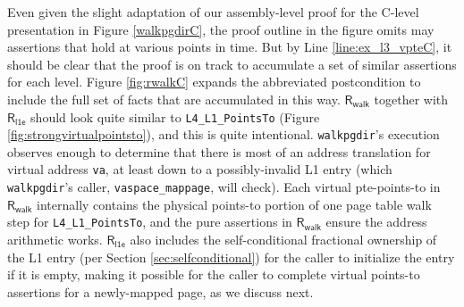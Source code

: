 Even given the slight adaptation of our assembly-level proof for the C-level presentation in Figure \ref{walkpgdirC},
the proof outline in the figure omits may assertions that hold at various points in time.
But by Line \ref{line:ex_l3_vpteC}, it should be clear that the proof is on track to accumulate a set of similar assertions for each level.
Figure \ref{fig:rwalkC} expands the abbreviated postcondition to include the full set of facts that are accumulated in this way.
$\mathsf{R}_\mathsf{walk}$ together with $\mathsf{R}_{\mathsf{l1e}}$ should look quite similar to \lstinline|L4_L1_PointsTo| (Figure \ref{fig:strongvirtualpointsto}),
and this is quite intentional. \lstinline|walkpgdir|'s execution observes enough
to determine that there is most of an address translation for virtual address \lstinline|va|,
at least down to a possibly-invalid L1 entry (which \lstinline|walkpgdir|'s caller, \lstinline|vaspace_mappage|, will check). 
Each virtual pte-points-to in $\mathsf{R}_\mathsf{walk}$ internally contains the physical points-to portion of one page table walk step for \lstinline|L4_L1_PointsTo|,
and the pure assertions in $\mathsf{R}_\mathsf{walk}$ ensure the address arithmetic works.
$\mathsf{R}_{\mathsf{l1e}}$ also includes the self-conditional fractional ownership of the L1 entry (per Section \ref{sec:selfconditional})
for the caller to initialize the entry if it is empty, making it possible for the caller to complete virtual points-to assertions
for a newly-mapped page, as we discuss next.




